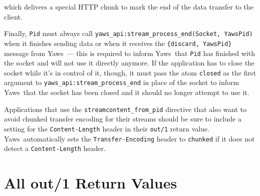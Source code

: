 \documentclass[11pt,oneside,english]{book}
\newcommand{\Yaws}            %
        {{\sc Yaws}}
\begin{document}
which delivers a special HTTP chunk to mark the end of the data
transfer to the client.

Finally, \verb+Pid+ must always call
\verb+yaws_api:stream_process_end(Socket, YawsPid)+ when it finishes
sending data or when it receives the \verb+{discard, YawsPid}+ message
from \Yaws\ --- this is required to inform \Yaws\ that \verb+Pid+ has
finished with the socket and will not use it directly anymore. If the
application has to close the socket while it's in control of it,
though, it must pass the atom \verb+closed+ as the first argument to
\verb+yaws_api:stream_process_end+ in place of the socket to inform
\Yaws\ that the socket has been closed and it should no longer attempt
to use it.

App\-li\-ca\-tions that use the \verb+streamcontent_from_pid+
directive that also want to a\-void chunked transfer encoding for
their streams should be sure to include a set\-ting for the
\verb+Content-Length+ header in their \verb+out/1+ return
value. \Yaws\ au\-to\-mat\-i\-cal\-ly sets the
\verb+Transfer-Encoding+ head\-er to \verb+chunked+ if it does not
detect a \verb+Content-Length+ header.

\section{All out/1 Return Values}
\end{document}
